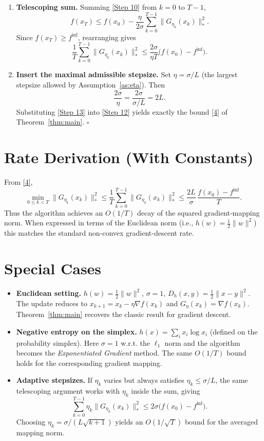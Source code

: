 \documentclass{article}
\newcommand{\Breg}[2]{D_{h}(#1,#2)}
\newcommand{\grad}{\nabla}
\begin{document}
\begin{enumerate}
\item \textbf{Telescoping sum.}  
Summing \eqref{Step 10} from $k=0$ to $T-1$,
\[
f(x_T)\le f(x_0)-\frac{\eta}{2\sigma}\sum_{k=0}^{T-1}\|G_{\eta_k}(x_k)\|_{*}^{2}.
\tag{Step 11}
\]
Since $f(x_T)\ge f^{\inf}$, rearranging gives
\[
\frac{1}{T}\sum_{k=0}^{T-1}\|G_{\eta_k}(x_k)\|_{*}^{2}
\le \frac{2\sigma}{\eta T}\bigl(f(x_0)-f^{\inf}\bigr).
\tag{Step 12}
\]

\item \textbf{Insert the maximal admissible stepsize.}  
Set $\eta=\sigma/L$ (the largest stepsize allowed by Assumption~\ref{as:eta}). Then
\[
\frac{2\sigma}{\eta}= \frac{2\sigma}{\sigma/L}=2L.
\tag{Step 13}
\]
Substituting \eqref{Step 13} into \eqref{Step 12} yields exactly the bound \eqref{4} of Theorem~\ref{thm:main}.
\hfill $\square$
\end{enumerate}

\section*{Rate Derivation (With Constants)}
From \eqref{4},
\[
\min_{0\le k<T}\|G_{\eta_k}(x_k)\|_{*}^{2}
\le \frac{1}{T}\sum_{k=0}^{T-1}\|G_{\eta_k}(x_k)\|_{*}^{2}
\le \frac{2L}{\sigma}\,\frac{f(x_0)-f^{\inf}}{T}.
\]
Thus the algorithm achieves an $O(1/T)$ decay of the squared gradient‑mapping norm. When expressed in terms of the Euclidean norm (i.e., $h(w)=\tfrac12\|w\|^{2}$) this matches the standard non‑convex gradient‑descent rate.

\section*{Special Cases}
\begin{itemize}
\item \textbf{Euclidean setting.} $h(w)=\tfrac12\|w\|^{2}$, $\sigma=1$, $\Breg{x}{y}=\tfrac12\|x-y\|^{2}$. The update reduces to $x_{k+1}=x_k-\eta\grad f(x_k)$ and $G_{\eta}(x_k)=\grad f(x_k)$. Theorem~\ref{thm:main} recovers the classic result for gradient descent.
\item \textbf{Negative entropy on the simplex.} $h(x)=\sum_{i}x_i\log x_i$ (defined on the probability simplex). Here $\sigma=1$ w.r.t. the $\ell_1$ norm and the algorithm becomes the \emph{Exponentiated Gradient} method. The same $O(1/T)$ bound holds for the corresponding gradient mapping.
\item \textbf{Adaptive stepsizes.} If $\eta_k$ varies but always satisfies $\eta_k\le\sigma/L$, the same telescoping argument works with $\eta_k$ inside the sum, giving  
\[
\sum_{k=0}^{T-1}\eta_k\|G_{\eta_k}(x_k)\|_{*}^{2}
\le 2\sigma\bigl(f(x_0)-f^{\inf}\bigr).
\]
Choosing $\eta_k=\sigma/(L\sqrt{k+1})$ yields an $O(1/\sqrt{T})$ bound for the averaged mapping norm.
\end{itemize}
\end{document}
